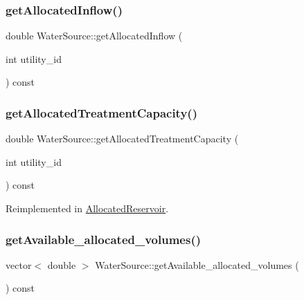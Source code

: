 \subsubsection{\texorpdfstring{get\+Allocated\+Inflow()}{getAllocatedInflow()}}
{\footnotesize\ttfamily double Water\+Source\+::get\+Allocated\+Inflow (\begin{DoxyParamCaption}\item[{int}]{utility\+\_\+id }\end{DoxyParamCaption}) const}

\mbox{\label{classWaterSource_ab3ba86d2a3e864e435ba2b88cceea555}} 
\subsubsection{\texorpdfstring{get\+Allocated\+Treatment\+Capacity()}{getAllocatedTreatmentCapacity()}}
{\footnotesize\ttfamily double Water\+Source\+::get\+Allocated\+Treatment\+Capacity (\begin{DoxyParamCaption}\item[{int}]{utility\+\_\+id }\end{DoxyParamCaption}) const\hspace{0.3cm}{\ttfamily [virtual]}}



Reimplemented in \mbox{\hyperlink{classAllocatedReservoir_aba81b93e1aa1154ce411248903fabde6}{Allocated\+Reservoir}}.

\mbox{\label{classWaterSource_a1087f5f2458803fd1d37383e303bd25f}} 
\subsubsection{\texorpdfstring{get\+Available\+\_\+allocated\+\_\+volumes()}{getAvailable\_allocated\_volumes()}}
{\footnotesize\ttfamily vector$<$ double $>$ Water\+Source\+::get\+Available\+\_\+allocated\+\_\+volumes (\begin{DoxyParamCaption}{ }\end{DoxyParamCaption}) const}

